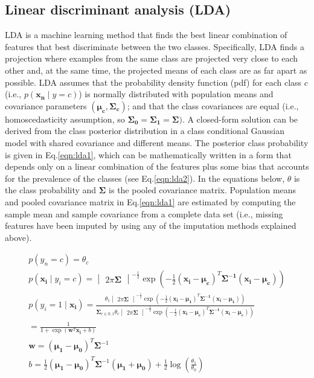 \documentclass[
   technote
]{phildoc}
\newcommand{\ie}{i.e.,}
\newcommand{\eq}{Eq.}
\begin{document}
\subsection{Linear discriminant analysis (LDA)}
\label{sec:lda}
LDA is a machine learning method that finds the best linear combination of features that best discriminate between the two classes. Specifically, LDA finds a projection where examples from the same class are projected very close to each other and, at the same time, the projected means of each class are as far apart as possible. LDA assumes that the probability density function (pdf) for each class $c$ (\ie{} $p(\bm{x_{n}}\mid y=c)$) is normally distributed with population means and covariance parameters $(\bm{\mu_{c}},\bm{\Sigma_{c}})$; and that the class covariances are equal (\ie{} homoscedasticity assumption, so $\bm{\Sigma_{0}} = \bm{\Sigma_{1}} = \bm{\Sigma})$. A closed-form solution can be derived from the class posterior distribution in a class conditional Gaussian model with shared covariance and different means. The posterior class probability is given in \eq{}\ref{eqn:lda1}, which can be mathematically written in a form that depends only on a linear combination of the features plus some bias that accounts for the prevalence of the classes (see \eq{}\ref{eqn:lda2}). In the equations below, $\theta$ is the class probability and $\bm{\Sigma}$ is the pooled covariance matrix. Population means and pooled covariance matrix in \eq{}\ref{eqn:lda1} are estimated by computing the sample mean and sample covariance from a complete data set (\ie{} missing features have been imputed by using any of the imputation methods explained above). 

\begin{eqnarray}
p(y_{n}=c)=\theta_{c} \\
p(\bm{x_{i}}\mid y_{i}=c) = \begin{vmatrix}2\pi\bm{\Sigma}\end{vmatrix}^{-\frac{1}{2}} \exp\left(-\frac{1}{2}(\bm{x_{i}}-\bm{\mu_{c}})^{T} \bm{\Sigma^{-1}} (\bm{x_{i}}-\bm{\mu_{c}}) \right) \\ 
p(y_{i}=1 \mid \bm{x_{i}}) = \frac{\theta_{1}\begin{vmatrix} 2\pi\bm{\Sigma}\end{vmatrix}^{-\frac{1}{2}}\exp\left(-\frac{1}{2}(\bm{x_{i}}-\bm{\mu_{1}})^{T} \bm{\Sigma^{-1}} (\bm{x_{i}}-\bm{\mu_{1}}) \right)}{\bm{\Sigma}_{c\in 0,1} \theta_{c}\begin{vmatrix}2\pi\bm{\Sigma}\end{vmatrix}^{-\frac{1}{2}} \exp\left(-\frac{1}{2}(\bm{x_{i}}-\bm{\mu_{c}})^{T} \bm{\Sigma^{-1}} (\bm{x_{i}}-\bm{\mu_{c}}) \right)} \label{eqn:lda1} \\
=\frac{1}{1+\exp(\bm{w}^{T}\bm{x_{i}} + b)} \label{eqn:lda2}\\
\bm{w} = \left(\bm{\mu_{1}} - \bm{\mu_{0}}\right)^{T}\bm{\Sigma}^{-1}\\
b = \frac{1}{2}\left(\bm{\mu_{1}} - \bm{\mu_{0}}\right)^{T}\bm{\Sigma}^{-1}\left(\bm{\mu_{1}} + \bm{\mu_{0}}\right) + \frac{1}{2}\log\left(\frac{\theta_{1}}{\theta_{0}}\right)
\end{eqnarray}
\end{document}
